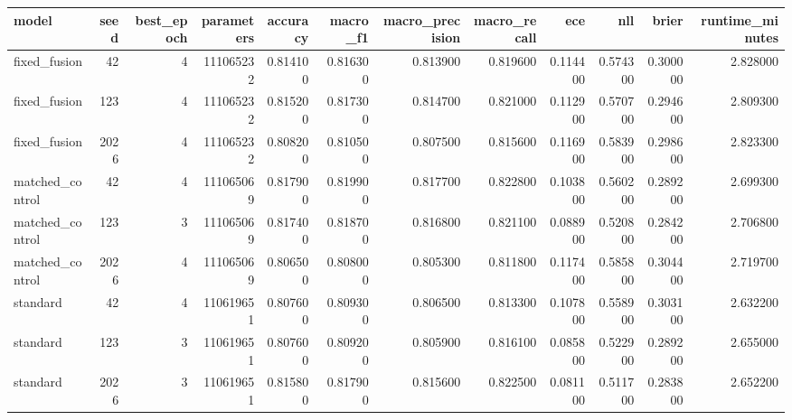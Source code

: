 \begin{tabular}{lrrrrrrrrrrr}
\toprule
model & seed & best\_epoch & parameters & accuracy & macro\_f1 & macro\_precision & macro\_recall & ece & nll & brier & runtime\_minutes \\
\midrule
fixed\_fusion & 42 & 4 & 111065232 & 0.814100 & 0.816300 & 0.813900 & 0.819600 & 0.114400 & 0.574300 & 0.300000 & 2.828000 \\
fixed\_fusion & 123 & 4 & 111065232 & 0.815200 & 0.817300 & 0.814700 & 0.821000 & 0.112900 & 0.570700 & 0.294600 & 2.809300 \\
fixed\_fusion & 2026 & 4 & 111065232 & 0.808200 & 0.810500 & 0.807500 & 0.815600 & 0.116900 & 0.583900 & 0.298600 & 2.823300 \\
matched\_control & 42 & 4 & 111065069 & 0.817900 & 0.819900 & 0.817700 & 0.822800 & 0.103800 & 0.560200 & 0.289200 & 2.699300 \\
matched\_control & 123 & 3 & 111065069 & 0.817400 & 0.818700 & 0.816800 & 0.821100 & 0.088900 & 0.520800 & 0.284200 & 2.706800 \\
matched\_control & 2026 & 4 & 111065069 & 0.806500 & 0.808000 & 0.805300 & 0.811800 & 0.117400 & 0.585800 & 0.304400 & 2.719700 \\
standard & 42 & 4 & 110619651 & 0.807600 & 0.809300 & 0.806500 & 0.813300 & 0.107800 & 0.558900 & 0.303100 & 2.632200 \\
standard & 123 & 3 & 110619651 & 0.807600 & 0.809200 & 0.805900 & 0.816100 & 0.085800 & 0.522900 & 0.289200 & 2.655000 \\
standard & 2026 & 3 & 110619651 & 0.815800 & 0.817900 & 0.815600 & 0.822500 & 0.081100 & 0.511700 & 0.283800 & 2.652200 \\
\bottomrule
\end{tabular}
